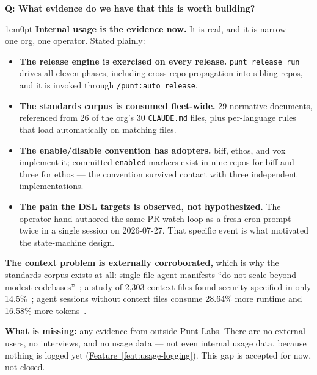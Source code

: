 \documentclass[11pt,letterpaper]{article}
\newcounter{faqnum}
\newenvironment{faqpair}[1]{%
  \needspace{4\baselineskip}%
  \vspace{0.5em}%
  \refstepcounter{faqnum}%
  \noindent\textbf{\color{SectionBlue}Q\thefaqnum: #1}\par\nopagebreak[4]%
  \vspace{0.2em}%
  \begin{adjustwidth}{1em}{0pt}%
  \setlength{\parindent}{0pt}%
}{%
  \end{adjustwidth}%
  \vspace{0.5em}%
}
\newcommand{\featureref}[1]{\hyperref[#1]{Feature~\ref*{#1}}}
\begin{document}
\begin{faqpair}{What evidence do we have that this is worth building?}\label{faq:customer-evidence}
  \textbf{Internal usage is the evidence now.} It is real, and it is narrow ---
  one org, one operator. Stated plainly:

  \begin{itemize}[nosep]
    \item \textbf{The release engine is exercised on every release.}
      \texttt{punt release run} drives all eleven phases, including cross-repo
      propagation into sibling repos, and it is invoked through
      \texttt{/punt:auto release}.
    \item \textbf{The standards corpus is consumed fleet-wide.} 29 normative
      documents, referenced from 26 of the org's 30 \texttt{CLAUDE.md} files,
      plus per-language rules that load automatically on matching files.
    \item \textbf{The enable/disable convention has adopters.} biff, ethos, and
      vox implement it; committed \texttt{enabled} markers exist in nine repos
      for biff and three for ethos --- the convention survived contact with
      three independent implementations.
    \item \textbf{The pain the DSL targets is observed, not hypothesized.} The
      operator hand-authored the same PR watch loop as a fresh cron prompt
      twice in a single session on 2026-07-27. That specific event is what
      motivated the state-machine design.
  \end{itemize}

  \textbf{The context problem is externally corroborated,} which is why the
  standards corpus exists at all: single-file agent manifests ``do not scale
  beyond modest codebases''~\cite{arxiv2602.20478}; a study of 2,303 context
  files found security specified in only 14.5\%~\cite{arxiv2511.12884}; agent
  sessions without context files consume 28.64\% more runtime and 16.58\% more
  tokens~\cite{arxiv2601.20404}.

  \textbf{What is missing:} any evidence from outside Punt Labs. There are no
  external users, no interviews, and no usage data --- not even internal usage
  data, because nothing is logged yet (\featureref{feat:usage-logging}). This
  gap is accepted for now, not closed.
\end{faqpair}
\end{document}
